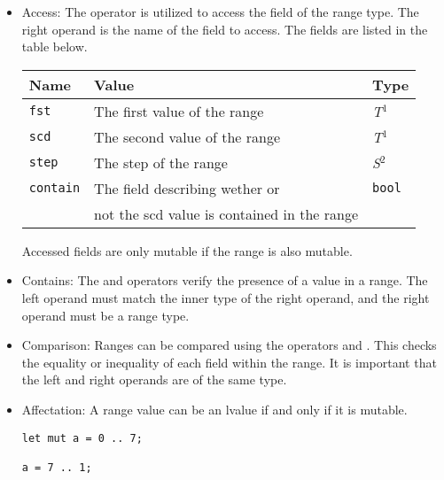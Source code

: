 \begin{itemize}
\item Access: The operator  is utilized to access the field of the
  range type. The right operand is the name of the field to access. The fields
  are listed in the table below.

  \begin{center}\begin{adjustbox}{max width=\linewidth}
    \begin{threeparttable}
      \begin{tabular}{|l|ll|}
        \hline
        Name & Value & Type\\
        \hline
        \hline
        \texttt {fst} & The first value of the range & \textit{T}$^{1^{\phantom{j}}}$ \\
        \texttt {scd} & The second value of the range & \textit{T}$^{1^{\phantom{j}}}$ \\
        \texttt {step} & The step of the range & \textit{S}$^{2^{\phantom{j}}}$ \\
        \texttt {contain} & The field describing wether or  & \texttt{bool} \\
        & not the scd value is contained in the range &\\
        \hline
      \end{tabular}
    \end{threeparttable}
\end{adjustbox}\end{center}

Accessed fields are only mutable if the range is also mutable.

\item Contains: The  and  operators verify the presence
  of a value in a range. The left operand must match the inner type of the right
  operand, and the right operand must be a range type.

\item Comparison: Ranges can be compared using the operators \token{==} and
  \token{!=}. This checks the equality or inequality of each field within the
  range. It is important that the left and right operands are of the same type.

\item Affectation: A range value can be an lvalue if and only if it is mutable.
  \begin{lstlisting}[style=coloredverbatim]
let mut a = 0 .. 7;

a = 7 .. 1;
  \end{lstlisting}

\end{itemize}


